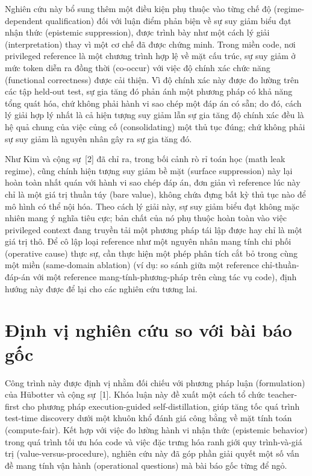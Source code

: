 Nghiên cứu này bổ sung thêm một điều kiện phụ thuộc vào từng chế độ (regime-dependent qualification) đối với luận điểm phản biện về sự suy giảm biểu đạt nhận thức (epistemic suppression), được trình bày như một cách lý giải (interpretation) thay vì một cơ chế đã được chứng minh. Trong miền code, nơi privileged reference là một chương trình hợp lệ về mặt cấu trúc, sự suy giảm ở mức token diễn ra đồng thời (co-occur) với việc độ chính xác chức năng (functional correctness) được cải thiện. Vì độ chính xác này được đo lường trên các tập held-out test, sự gia tăng đó phản ánh một phương pháp có khả năng tổng quát hóa, chứ không phải hành vi sao chép một đáp án có sẵn; do đó, cách lý giải hợp lý nhất là cả hiện tượng suy giảm lẫn sự gia tăng độ chính xác đều là hệ quả chung của việc củng cố (consolidating) một thủ tục đúng; chứ không phải sự suy giảm là nguyên nhân gây ra sự gia tăng đó.

Như Kim và cộng sự~{[}2{]} đã chỉ ra, trong bối cảnh rò rỉ toán học (math leak regime), cũng chính hiện tượng suy giảm bề mặt (surface suppression) này lại hoàn toàn nhất quán với hành vi sao chép đáp án, đơn giản vì reference lúc này chỉ là một giá trị thuần túy (bare value), không chứa đựng bất kỳ thủ tục nào để mô hình có thể nội hóa. Theo cách lý giải này, sự suy giảm biểu đạt không mặc nhiên mang ý nghĩa tiêu cực; bản chất của nó phụ thuộc hoàn toàn vào việc privileged context đang truyền tải một phương pháp tái lập được hay chỉ là một giá trị thô. Để cô lập loại reference như một nguyên nhân mang tính chi phối (operative cause) thực sự, cần thực hiện một phép phân tích cắt bỏ trong cùng một miền (same-domain ablation) (ví dụ: so sánh giữa một reference chỉ-thuần-đáp-án với một reference mang-tính-phương-pháp trên cùng tác vụ code), định hướng này được để lại cho các nghiên cứu tương lai.

\section{Định vị nghiên cứu so với bài báo gốc}\label{position-relative-to-the-parent-paper}

Công trình này được định vị nhằm đối chiếu với phương pháp luận (formulation) của Hübotter và cộng sự~{[}1{]}. Khóa luận này đề xuất một cách tổ chức teacher-first cho phương pháp execution-guided self-distillation, giúp tăng tốc quá trình test-time discovery dưới một khuôn khổ đánh giá công bằng về mặt tính toán (compute-fair). Kết hợp với việc đo lường hành vi nhận thức (epistemic behavior) trong quá trình tối ưu hóa code và việc đặc trưng hóa ranh giới quy trình-và-giá trị (value-versus-procedure), nghiên cứu này đã góp phần giải quyết một số vấn đề mang tính vận hành (operational questions) mà bài báo gốc từng để ngỏ.
